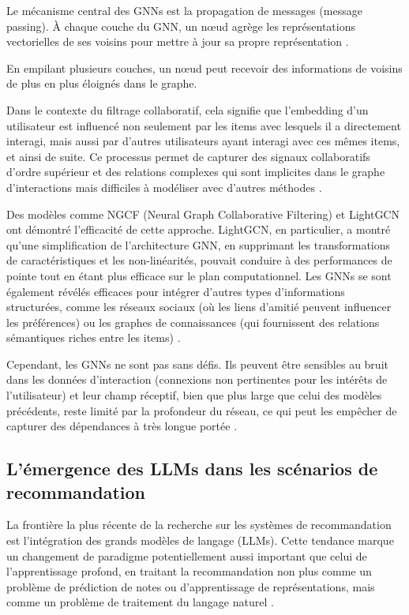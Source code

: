 Le mécanisme central des GNNs est la propagation de messages (message passing). À chaque couche du GNN, un nœud agrège les représentations vectorielles de ses voisins pour mettre à jour sa propre représentation \citep{Gilmer2020Neural}.

En empilant plusieurs couches, un nœud peut recevoir des informations de voisins de plus en plus éloignés dans le graphe.

Dans le contexte du filtrage collaboratif, cela signifie que l'embedding d'un utilisateur est influencé non seulement par les items avec lesquels il a directement interagi, mais aussi par d'autres utilisateurs ayant interagi avec ces mêmes items, et ainsi de suite. Ce processus permet de capturer des signaux collaboratifs d'ordre supérieur et des relations complexes qui sont implicites dans le graphe d'interactions mais difficiles à modéliser avec d'autres méthodes \citep{Wang2019, He2025Lightgcn}.

Des modèles comme NGCF (Neural Graph Collaborative Filtering) \citet{Wang2019} et LightGCN \citet{He2025Lightgcn} ont démontré l'efficacité de cette approche. LightGCN, en particulier, a montré qu'une simplification de l'architecture GNN, en supprimant les transformations de caractéristiques et les non-linéarités, pouvait conduire à des performances de pointe tout en étant plus efficace sur le plan computationnel. Les GNNs se sont également révélés efficaces pour intégrer d'autres types d'informations structurées, comme les réseaux sociaux (où les liens d'amitié peuvent influencer les préférences) ou les graphes de connaissances (qui fournissent des relations sémantiques riches entre les items) \citep{Fan2019, Wang2019a}.

Cependant, les GNNs ne sont pas sans défis. Ils peuvent être sensibles au bruit dans les données d'interaction (connexions non pertinentes pour les intérêts de l'utilisateur) et leur champ réceptif, bien que plus large que celui des modèles précédents, reste limité par la profondeur du réseau, ce qui peut les empêcher de capturer des dépendances à très longue portée \citep{Ying2018, Wu2023Graph}.

\subsection{L'émergence des LLMs dans les scénarios de recommandation}

La frontière la plus récente de la recherche sur les systèmes de recommandation est l'intégration des grands modèles de langage (LLMs). Cette tendance marque un changement de paradigme potentiellement aussi important que celui de l'apprentissage profond, en traitant la recommandation non plus comme un problème de prédiction de notes ou d'apprentissage de représentations, mais comme un problème de traitement du langage naturel \citep{Geng2022Recommendation}.

